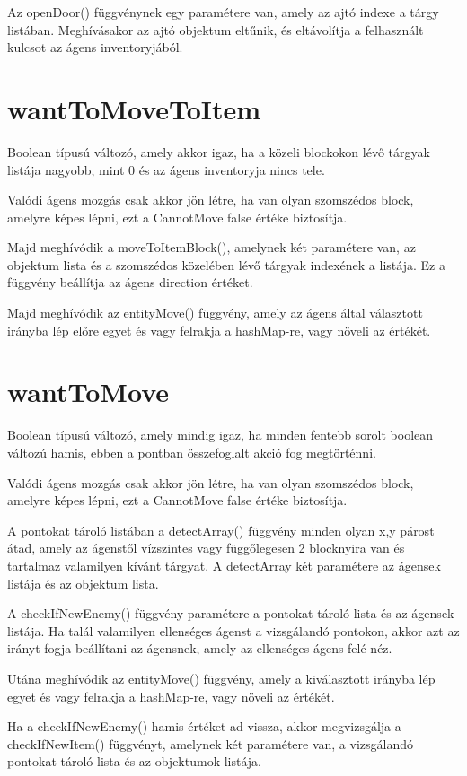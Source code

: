 Az openDoor() függvénynek egy paramétere van, amely az ajtó indexe a tárgy listában. Meghívásakor
az ajtó objektum eltűnik, és eltávolítja a felhasznált kulcsot az ágens inventoryjából.

\section{wantToMoveToItem}

Boolean típusú változó, amely akkor igaz, ha a közeli blockokon lévő tárgyak listája nagyobb, mint 0 és az ágens inventoryja nincs tele.

Valódi ágens mozgás csak akkor jön létre, ha van olyan szomszédos block, amelyre képes lépni, ezt a CannotMove false értéke biztosítja.

Majd meghívódik a moveToItemBlock(), amelynek két paramétere van, az objektum lista és a szomszédos közelében lévő tárgyak indexének a listája.
Ez a függvény beállítja az ágens direction értéket.

Majd meghívódik az entityMove() függvény, amely az ágens által választott irányba lép előre egyet és vagy felrakja a hashMap-re, vagy növeli az értékét.

\section{wantToMove}

Boolean típusú változó, amely mindig igaz, ha minden fentebb sorolt boolean változú hamis, ebben a pontban összefoglalt akció fog megtörténni.

Valódi ágens mozgás csak akkor jön létre, ha van olyan szomszédos block, amelyre képes lépni, ezt a CannotMove false értéke biztosítja.

A pontokat tároló listában a detectArray() függvény minden olyan x,y párost átad, amely az ágenstől vízszintes vagy függőlegesen 2 blocknyira van
és tartalmaz valamilyen kívánt tárgyat. A detectArray két paramétere az ágensek listája és az objektum lista.

A checkIfNewEnemy() függvény paramétere a pontokat tároló lista és az ágensek listája. Ha talál valamilyen ellenséges ágenst
a vizsgálandó pontokon, akkor azt az irányt fogja beállítani az ágensnek, amely az ellenséges ágens felé néz.

Utána meghívódik az entityMove() függvény, amely a kiválasztott irányba lép egyet és vagy felrakja a hashMap-re, vagy növeli az értékét.

Ha a checkIfNewEnemy() hamis értéket ad vissza, akkor megvizsgálja a checkIfNewItem() függvényt, amelynek két paramétere van, a
vizsgálandó pontokat tároló lista és az objektumok listája.

